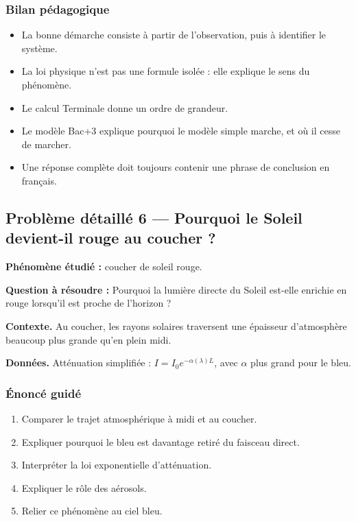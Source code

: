 \documentclass[11pt,a4paper]{article}
\begin{document}
\subsubsection*{Bilan pédagogique}

\begin{methodebox}
\begin{itemize}
  \item La bonne démarche consiste à partir de l'observation, puis à identifier le système.
  \item La loi physique n'est pas une formule isolée : elle explique le sens du phénomène.
  \item Le calcul Terminale donne un ordre de grandeur.
  \item Le modèle Bac+3 explique pourquoi le modèle simple marche, et où il cesse de marcher.
  \item Une réponse complète doit toujours contenir une phrase de conclusion en français.
\end{itemize}
\end{methodebox}

\subsection{Problème détaillé 6 — Pourquoi le Soleil devient-il rouge au coucher ?}

\begin{exercicebox}
\textbf{Phénomène étudié :} coucher de soleil rouge.

\medskip
\textbf{Question à résoudre :} Pourquoi la lumière directe du Soleil est-elle enrichie en rouge lorsqu'il est proche de l'horizon ?

\medskip
\textbf{Contexte.} Au coucher, les rayons solaires traversent une épaisseur d'atmosphère beaucoup plus grande qu'en plein midi.

\medskip
\textbf{Données.} Atténuation simplifiée : \(I=I_0e^{-\alpha(\lambda)L}\), avec \(\alpha\) plus grand pour le bleu.
\end{exercicebox}

\subsubsection*{Énoncé guidé}

\begin{enumerate}
  \item Comparer le trajet atmosphérique à midi et au coucher.
  \item Expliquer pourquoi le bleu est davantage retiré du faisceau direct.
  \item Interpréter la loi exponentielle d'atténuation.
  \item Expliquer le rôle des aérosols.
  \item Relier ce phénomène au ciel bleu.
\end{enumerate}
\end{document}
